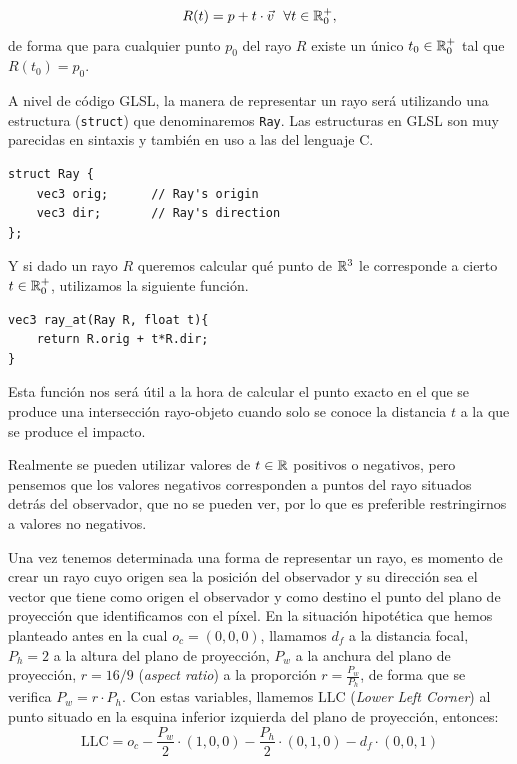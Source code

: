$$
R(t) = p + t\cdot \vec v \ \ \forall t\in\mathbb{R}_0^+,
$$
de forma que para cualquier punto $p_0$ del rayo $R$ existe un único $t_0\in\mathbb{R}_0^+$ tal que $R(t_0) = p_0$.

A nivel de código GLSL, la manera de representar un rayo será utilizando una estructura (\verb|struct|) que denominaremos \verb|Ray|. Las estructuras en GLSL son muy parecidas en sintaxis y también en uso a las del lenguaje C. 

\begin{lstlisting}
struct Ray {
    vec3 orig;      // Ray's origin
    vec3 dir;       // Ray's direction
};
\end{lstlisting}

Y si dado un rayo $R$ queremos calcular qué punto de $\mathbb{R}^3$ le corresponde a cierto $t\in\mathbb{R}_0^+$, utilizamos la siguiente función.

\begin{lstlisting}
vec3 ray_at(Ray R, float t){
    return R.orig + t*R.dir;
}
\end{lstlisting}

Esta función nos será útil a la hora de calcular el punto exacto en el que se produce una intersección rayo-objeto cuando solo se conoce la distancia $t$ a la que se produce el impacto.

\begin{observacion}
    Realmente se pueden utilizar valores de $t\in\mathbb{R}$ positivos o negativos, pero pensemos que los valores negativos corresponden a puntos del rayo situados detrás del observador, que no se pueden ver, por lo que es preferible restringirnos a valores no negativos.
\end{observacion}

Una vez tenemos determinada una forma de representar un rayo, es momento de crear un rayo cuyo origen sea la posición del observador y su dirección sea el vector que tiene como origen el observador y como destino el punto del plano de proyección que identificamos con el píxel. En la situación hipotética que hemos planteado antes en la cual $o_c=(0,0,0)$, llamamos $d_f$ a la distancia focal, $P_h=2$ a la altura del plano de proyección, $P_w$ a la anchura del plano de proyección, $r = 16/9$ (\textit{aspect ratio}) a la proporción $r = \frac{P_w}{P_h}$, de forma que se verifica $P_w=r\cdot P_h$. Con estas variables, llamemos $\mathrm{LLC}$ (\textit{Lower Left Corner}) al punto situado en la esquina inferior izquierda del plano de proyección, entonces:
\begin{equation}
    \label{eq:LLC-inicial}
    \mathrm{LLC} = o_c - \frac{P_w}{2}\cdot(1,0,0) - \frac{P_h}{2}\cdot(0,1,0) - d_f \cdot (0,0,1)
\end{equation}

